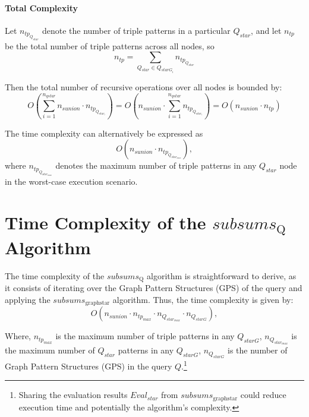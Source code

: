 \paragraph{Total Complexity}
Let $n_{tp_{Q_{star}}}$ denote the number of triple patterns in a particular $Q_{star}$, and let $n_{tp}$ be the total number of triple patterns across all nodes, so
$$
n_{tp} = \sum_{Q_{star} \in Q_{starG_i}} n_{tp_{Q_{star}}}
$$

Then the total number of recursive operations over all nodes is bounded by:
$$
O\left(\sum_{i=1}^{n_{qstar}} n_{sunion} \cdot n_{tp_{Q_{star_i}}}\right) =O\left(n_{sunion} \cdot \sum_{i=1}^{n_{qstar}} n_{tp_{Q_{star_i}}}\right) = O(n_{sunion} \cdot n_{tp})
$$

The time complexity can alternatively be expressed as
\begin{equation}
O(n_{sunion} \cdot n_{tp_{Q_{star_{max}}}}),
\end{equation}
where $n_{tp_{Q_{star_{max}}}}$ denotes the maximum number of triple patterns in any $Q_{star}$ node in the worst-case execution scenario.

\section{Time Complexity of the $subsums_{\mathrm{Q}}$ Algorithm}



The time complexity of the $subsums_{\mathrm{Q}}$ algorithm is straightforward to derive, as it consists of iterating over the Graph Pattern Structures (GPS) of the query and applying the $subsums_{\mathrm{graph star}}$ algorithm. Thus, the time complexity is given by:
\begin{equation}
O(n_{sunion} \cdot n_{tp_{max}} \cdot n_{Q_{star_{max}}} \cdot n_{Q_{starG}}),
\end{equation}

Where, $n_{tp_{max}}$ is the maximum number of triple patterns in any $Q_{starG}$,
$n_{Q_{star_{max}}}$ is the maximum number of $Q_{star}$ patterns in any $Q_{starG}$,
$n_{Q_{starG}}$ is the number of Graph Pattern Structures (GPS) in the query $Q$.\footnote{
    Sharing the evaluation results $Eval_{star}$ from $subsums_{\mathrm{graph star}}$ could reduce execution time and potentially the algorithm's complexity.
}
